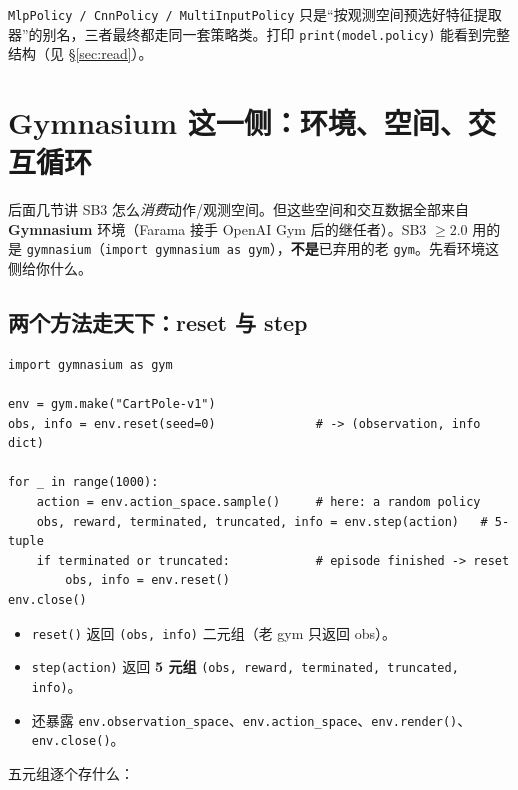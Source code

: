 \documentclass[11pt,a4paper]{article}
\begin{document}
\begin{srcbox}
\texttt{MlpPolicy / CnnPolicy / MultiInputPolicy} 只是“按观测空间预选好特征提取器”的别名，三者最终都走同一套策略类。打印 \texttt{print(model.policy)} 能看到完整结构（见 \S\ref{sec:read}）。
\end{srcbox}

\section{Gymnasium 这一侧：环境、空间、交互循环}
\label{sec:gym}

后面几节讲 SB3 怎么\emph{消费}动作/观测空间。但这些空间和交互数据全部来自 \textbf{Gymnasium} 环境（Farama 接手 OpenAI Gym 后的继任者）。SB3 $\ge 2.0$ 用的是 \texttt{gymnasium}（\texttt{import gymnasium as gym}），\textbf{不是}已弃用的老 \texttt{gym}。先看环境这侧给你什么。

\subsection{两个方法走天下：reset 与 step}

\begin{lstlisting}
import gymnasium as gym

env = gym.make("CartPole-v1")
obs, info = env.reset(seed=0)              # -> (observation, info dict)

for _ in range(1000):
    action = env.action_space.sample()     # here: a random policy
    obs, reward, terminated, truncated, info = env.step(action)   # 5-tuple
    if terminated or truncated:            # episode finished -> reset
        obs, info = env.reset()
env.close()
\end{lstlisting}

\begin{itemize}
\item \texttt{reset()} 返回 \texttt{(obs, info)} 二元组（老 gym 只返回 obs）。
\item \texttt{step(action)} 返回 \textbf{5 元组} \texttt{(obs, reward, terminated, truncated, info)}。
\item 还暴露 \texttt{env.observation\_space}、\texttt{env.action\_space}、\texttt{env.render()}、\texttt{env.close()}。
\end{itemize}

五元组逐个存什么：
\end{document}
